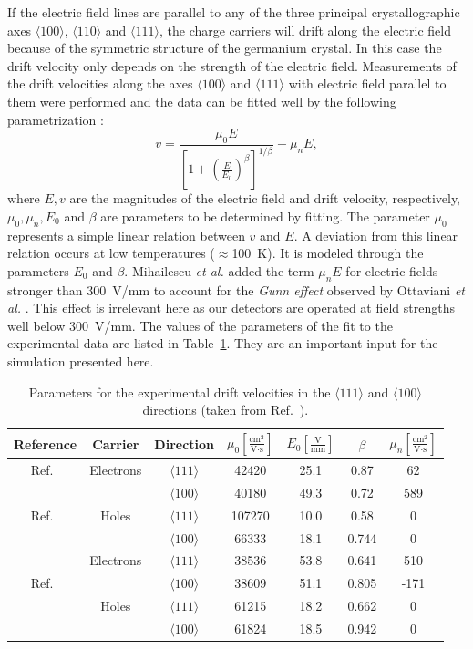 If the electric field lines are parallel to any of the three principal
crystallographic axes $\langle 100 \rangle$, $\langle 110 \rangle$ and
$\langle 111 \rangle$, the charge carriers will drift along the
electric field because of the symmetric structure of the germanium
crystal. In this case the drift velocity only depends on the strength
of the electric field. Measurements of the drift velocities along the
axes $\langle 100 \rangle$ and $\langle 111 \rangle$ with electric
field parallel to them were performed and the data can be fitted well
by the following parametrization \cite{Kno99}:
\begin{equation} 
\label{eq:pss:para} 
v = \frac{\mu_{0}E}{[1+(\frac{E}{E_{0}})^{\beta}]^{1/\beta}} - \mu_{n}E, 
\end{equation} 
where $E, v$ are the magnitudes of the electric field and drift
velocity, respectively, $\mu_{0}, \mu_{n}, E_{0}$ and $\beta$ are
parameters to be determined by fitting. The parameter $\mu_{0}$
represents a simple linear relation between $v$ and $E$. A deviation
from this linear relation occurs at low temperatures
($\approx$100~K). It is modeled through the parameters $E_{0}$ and
$\beta$. Mihailescu \textit{et al.} \cite{miha} added the term
$\mu_{n}E$ for electric fields stronger than 300~V/mm to account for
the \emph{Gunn effect} observed by Ottaviani \textit{et al.}
\cite{otta}. This effect is irrelevant here as our detectors are
operated at field strengths well below 300~V/mm. The values of the
parameters of the fit to the experimental data are listed in
Table~\ref{tab:pss:pars}. They are an important input for the
simulation presented here.
 
\begin{table}[tbhp] 
\centering 
\caption{Parameters for the experimental drift velocities in the 
$\langle111\rangle$ and $\langle 100 \rangle$ directions 
(taken from Ref.~\cite{bart}).} 
\label{tab:pss:pars}
\begin{tabular*}{\textwidth}{ccccccc}\hline\hline 
Reference & Carrier & Direction & $\mu_{0} \left[ \frac{\mbox{cm}^{2}}{\mbox{V}\cdot\mbox{s}} \right]$ & $E_{0} \left[ \frac{\mbox{V}}{\mbox{mm}} \right]$ & $\beta$ & $\mu_{n} \left[ \frac{\mbox{cm}^{2}}{\mbox{V}\cdot\mbox{s}} \right]$ \\\hline 
Ref.~\cite{miha}& Electrons & $\langle111\rangle$ & 42420 & 25.1 & 0.87 & 62 \\ 
& & $\langle100\rangle$ & 40180 & 49.3 & 0.72 & 589 \\ 
Ref.~\cite{reg}& Holes & $\langle111\rangle$ & 107270 & 10.0 & 0.58 & 0 \\ 
& & $\langle100\rangle$ & 66333 & 18.1 & 0.744 & 0 \\\hline 
& Electrons & $\langle111\rangle$ & 38536 & 53.8 & 0.641 & 510 \\ 
Ref.~\cite{bart}& & $\langle100\rangle$ & 38609 & 51.1 & 0.805 & -171\\  
& Holes & $\langle111\rangle$ & 61215 & 18.2 & 0.662 & 0 \\ 
& & $\langle100\rangle$ & 61824 & 18.5 & 0.942 & 0 \\\hline\hline 
\end{tabular*} 
\end{table} 
 

